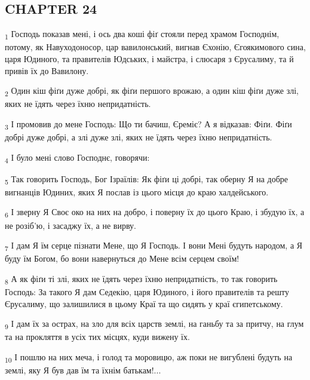 \subsection{CHAPTER 24}
\begin{tcolorbox}
\textsubscript{1} Господь показав мені, і ось два коші фіґ стояли перед храмом Господнім, потому, як Навуходоносор, цар вавилонський, вигнав Єхонію, Єгоякимового сина, царя Юдиного, та правителів Юдських, і майстра, і слюсаря з Єрусалиму, та й привів їх до Вавилону.
\end{tcolorbox}
\begin{tcolorbox}
\textsubscript{2} Один кіш фіґи дуже добрі, як фіґи першого врожаю, а один кіш фіґи дуже злі, яких не їдять через їхню непридатність.
\end{tcolorbox}
\begin{tcolorbox}
\textsubscript{3} І промовив до мене Господь: Що ти бачиш, Єреміє? А я відказав: Фіґи. Фіґи добрі дуже добрі, а злі дуже злі, яких не їдять через їхню непридатність.
\end{tcolorbox}
\begin{tcolorbox}
\textsubscript{4} І було мені слово Господнє, говорячи:
\end{tcolorbox}
\begin{tcolorbox}
\textsubscript{5} Так говорить Господь, Бог Ізраїлів: Як фіґи ці добрі, так оберну Я на добре вигнанців Юдиних, яких Я послав із цього місця до краю халдейського.
\end{tcolorbox}
\begin{tcolorbox}
\textsubscript{6} І зверну Я Своє око на них на добро, і поверну їх до цього Краю, і збудую їх, а не розіб'ю, і засаджу їх, а не вирву.
\end{tcolorbox}
\begin{tcolorbox}
\textsubscript{7} І дам Я їм серце пізнати Мене, що Я Господь. І вони Мені будуть народом, а Я буду їм Богом, бо вони навернуться до Мене всім серцем своїм!
\end{tcolorbox}
\begin{tcolorbox}
\textsubscript{8} А як фіґи ті злі, яких не їдять через їхню непридатність, то так говорить Господь: За такого Я дам Седекію, царя Юдиного, і його правителів та решту Єрусалиму, що залишилися в цьому Краї та що сидять у краї єгипетському.
\end{tcolorbox}
\begin{tcolorbox}
\textsubscript{9} І дам їх за острах, на зло для всіх царств землі, на ганьбу та за притчу, на глум та на прокляття в усіх тих місцях, куди вижену їх.
\end{tcolorbox}
\begin{tcolorbox}
\textsubscript{10} І пошлю на них меча, і голод та моровицю, аж поки не вигублені будуть на землі, яку Я був дав їм та їхнім батькам!...
\end{tcolorbox}
